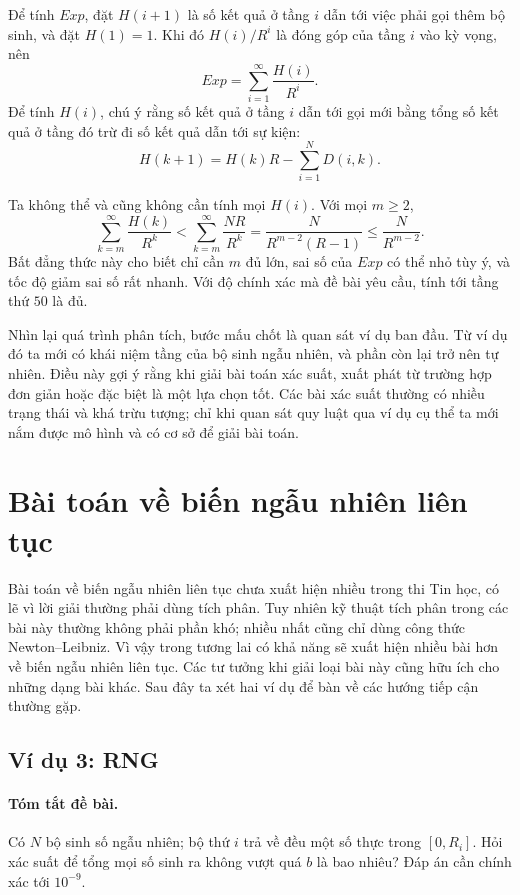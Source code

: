 \documentclass[11pt]{article}
\begin{document}
Để tính \(\mathit{Exp}\), đặt \(H(i+1)\) là số kết quả ở tầng \(i\) dẫn tới
việc phải gọi thêm bộ sinh, và đặt \(H(1)=1\). Khi đó \(H(i)/R^i\) là đóng góp
của tầng \(i\) vào kỳ vọng, nên
\[
  \mathit{Exp}=\sum_{i=1}^{\infty}\frac{H(i)}{R^i}.
\]
Để tính \(H(i)\), chú ý rằng số kết quả ở tầng \(i\) dẫn tới gọi mới bằng
tổng số kết quả ở tầng đó trừ đi số kết quả dẫn tới sự kiện:
\[
  H(k+1)=H(k)R-\sum_{i=1}^{N}D(i,k).
\]

Ta không thể và cũng không cần tính mọi \(H(i)\). Với mọi \(m\ge 2\),
\[
  \sum_{k=m}^{\infty}\frac{H(k)}{R^k}
  <
  \sum_{k=m}^{\infty}\frac{NR}{R^k}
  =
  \frac{N}{R^{m-2}(R-1)}
  \le
  \frac{N}{R^{m-2}}.
\]
Bất đẳng thức này cho biết chỉ cần \(m\) đủ lớn, sai số của \(\mathit{Exp}\)
có thể nhỏ tùy ý, và tốc độ giảm sai số rất nhanh. Với độ chính xác mà đề bài
yêu cầu, tính tới tầng thứ \(50\) là đủ.

Nhìn lại quá trình phân tích, bước mấu chốt là quan sát ví dụ ban đầu. Từ ví
dụ đó ta mới có khái niệm tầng của bộ sinh ngẫu nhiên, và phần còn lại trở nên
tự nhiên. Điều này gợi ý rằng khi giải bài toán xác suất, xuất phát từ trường
hợp đơn giản hoặc đặc biệt là một lựa chọn tốt. Các bài xác suất thường có
nhiều trạng thái và khá trừu tượng; chỉ khi quan sát quy luật qua ví dụ cụ thể
ta mới nắm được mô hình và có cơ sở để giải bài toán.

\section{Bài toán về biến ngẫu nhiên liên tục}

Bài toán về biến ngẫu nhiên liên tục chưa xuất hiện nhiều trong thi Tin học,
có lẽ vì lời giải thường phải dùng tích phân. Tuy nhiên kỹ thuật tích phân
trong các bài này thường không phải phần khó; nhiều nhất cũng chỉ dùng công
thức Newton--Leibniz. Vì vậy trong tương lai có khả năng sẽ xuất hiện nhiều
bài hơn về biến ngẫu nhiên liên tục. Các tư tưởng khi giải loại bài này cũng
hữu ích cho những dạng bài khác. Sau đây ta xét hai ví dụ để bàn về các hướng
tiếp cận thường gặp.

\subsection{Ví dụ 3: RNG}

\paragraph{Tóm tắt đề bài.}
Có \(N\) bộ sinh số ngẫu nhiên; bộ thứ \(i\) trả về đều một số thực trong
\([0,R_i]\). Hỏi xác suất để tổng mọi số sinh ra không vượt quá \(b\) là bao
nhiêu? Đáp án cần chính xác tới \(10^{-9}\).
\end{document}
